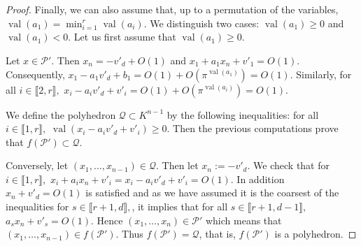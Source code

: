 \documentclass{elsarticle}
\theoremstyle{plain}
\theoremstyle{definition}
\newcommand{\PP}{\mathcal{P}}
\newcommand{\Qc}{\mathcal{Q}}
\DeclareMathOperator{\val}{val}
\begin{document}
\begin{proof}
Finally, we can also assume that, up to a permutation of the variables, $\val(a_1)= \min_{i=1}^{r} \val(a_i).$
We distinguish two cases: $\val(a_1) \geq 0$ and $\val(a_1)<0.$
Let us first assume that $\val(a_1) \geq 0$.

Let $x \in \PP'$.
Then $x_n=-v'_d+O(1)$
and $x_1+a_1 x_n+v'_1=O(1).$
Consequently, $x_1-a_1 v'_d +b_1=O(1)+O(\pi^{\val(a_1)})=O(1).$
Similarly, for all $i \in \llbracket 2,r \rrbracket,$
$x_i-a_i v'_d+v'_i=O(1)+O(\pi^{\val(a_i)})=O(1).$

We define the polyhedron $\Qc \subset K^{n-1}$ by the following inequalities:
 for all $i \in \llbracket 1,r \rrbracket,$
$\val(x_i-a_iv'_d+v'_i) \geq 0$. Then the previous computations prove that $f(\PP')\subset \Qc.$

Conversely, let $(x_1,\dots,x_{n-1}) \in \Qc.$
Then let $x_n := -v'_d.$
We check that for $i \in \llbracket 1,r \rrbracket,$
$x_i+a_ix_n+v'_i=x_i-a_iv'_d+v'_i=O(1).$
In addition $x_n+v'_d=O(1)$ is satisfied
and as we have assumed it is the coarsest of the inequalities
for $s \in \llbracket r+1,d \rrbracket,$, it implies that 
for all $s \in \llbracket r+1,d-1 \rrbracket,$
$a_s x_n+v'_s=O(1)$.
Hence $(x_1,\dots,x_n) \in \PP'$
which means that $(x_1,\dots,x_{n-1}) \in f(\PP').$
Thus $f(\PP')= \Qc$, that is, $f(\PP')$ is a polyhedron.


\end{proof}
\end{document}
